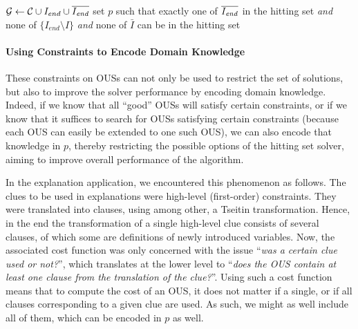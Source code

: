 \begin{algorithm}[t]
  \caption{$\call{bestStep--c-OUS}({\cal C},f,I,I_{end})$}
  \label{alg:singleStepExplain3}
$\mathcal{G}  \gets {\cal C} \cup I_{end} \cup \overline{I_{\mathit{end}}}$\;
set $p$ such that exactly one of $\overline{I_{\mathit{end}}}$ in the hitting set \textit{and} none of $\{I_{end} \setminus I\}$ \textit{and} none of $\bar{I}$ can be in the hitting set\;
\;
\end{algorithm}

\paragraph{Using Constraints to Encode Domain Knowledge}
These constraints on OUSs can not only be used to restrict the set of solutions, but also to improve the solver performance by encoding domain knowledge.
Indeed, if we know that all ``good'' OUSs will satisfy certain constraints, or if we know that it suffices to search for OUSs satisfying certain constraints (because each OUS can easily be extended to one such OUS),  we can also encode that knowledge in $p$, thereby restricting the possible options of the hitting set solver, aiming to improve overall performance of the algorithm. 

In the explanation application, we encountered this phenomenon as follows. 
The clues to be used in explanations were high-level (first-order) constraints. They were translated into clauses, using among other, a Tseitin transformation.
Hence, in the end the transformation of a single high-level clue consists of several clauses, of which some are definitions of newly introduced variables. 
Now, the associated cost function was only concerned with the issue ``\emph{was a certain clue used or not?}'', which translates at the lower level to ``\emph{does the OUS contain at least one clause from the translation of the clue?}''.
Using such a cost function means that to compute the cost of an OUS, it does not matter if a single, or if all clauses corresponding to a given clue are used. As such, we might as well include all of them, which can be encoded in $p$ as well. 

